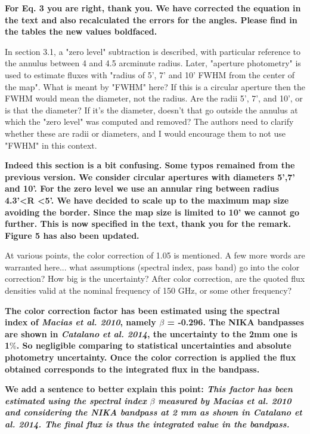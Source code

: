\documentclass[12pt]{article}
\begin{document}
\begin{enumerate}
{\bf For Eq. 3 you are right, thank you. We have corrected the equation in the text and also recalculated the errors for the angles. Please find in the tables the new values boldfaced.}

In section 3.1, a "zero level" subtraction is described, with 
particular reference to the annulus between 4 and 4.5 arcminute 
radius. Later, "aperture photometry" is used to estimate fluxes with 
"radius of 5', 7' and 10' FWHM from the center of the map". What is 
meant by "FWHM" here? If this is a circular aperture then the FWHM 
would mean the diameter, not the radius. Are the radii 5', 7', and 
10', or is that the diameter? If it's the diameter, doesn't that go 
outside the annulus at which the "zero level" was computed and 
removed? The authors need to clarify whether these are radii or 
diameters, and I would encourage them to not use "FWHM" in this 
context. 

\textbf{Indeed this section is a bit confusing. Some typos remained from the previous version.
  We consider circular apertures with diameters 5',7' and 10'.
  For the zero level we use an annular ring between radius 4.3'\textless R \textless 5'. We have decided to scale up to the maximum map size avoiding the border. Since the map size is limited to 10' we cannot go further. This is now specified in the text, thank you for the remark. Figure 5 has also been updated.}

At various points, the color correction of 1.05 is mentioned. A few 
more words are warranted here... what assumptions (spectral index, 
pass band) go into the color correction? How big is the uncertainty? 
After color correction, are the quoted flux densities valid at the 
nominal frequency of 150 GHz, or some other frequency? 

\textbf{The color correction factor has been estimated using the spectral index of {\it Macias et al. 2010}, namely $\beta$ = -0.296. The NIKA bandpasses are shown in {\it Catalano et al. 2014}, the uncertainty to the 2mm one is 1$\%$. So negligible comparing to statistical uncertainties and absolute photometry uncertainty. Once the color correction is applied the flux obtained corresponds to the integrated flux in the bandpass.}

{\bf  We add a sentence to better explain this point:
 {\it This factor has been estimated using the spectral index $\beta$ measured by {\it Macias et al. 2010} and considering the NIKA bandpass at 2 mm as shown in {\it Catalano et al. 2014}. The final flux is thus the integrated value in the bandpass.}}


\end{enumerate}
\end{document}
